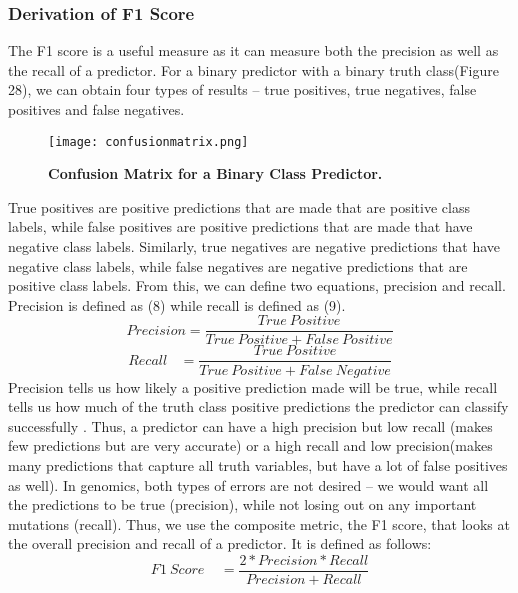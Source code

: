 \documentclass{article}
\begin{document}
\subsubsection{Derivation of F1 Score}
The F1 score is a useful measure as it can measure both the precision as well as the recall of a predictor. For a binary predictor with a binary truth class(Figure 28), we can obtain four types of results -- true positives, true negatives, false positives and false negatives. 
\begin{figure}[H]
\texttt{[image: confusionmatrix.png]}
\caption{\textbf{Confusion Matrix for a Binary Class Predictor.}}
\centering
\end{figure}
True positives are positive predictions that are made that are positive class labels, while false positives are positive predictions that are made that have negative class labels. Similarly, true negatives are negative predictions that have negative class labels, while false negatives are negative predictions that are positive class labels. From this, we can define two equations, precision and recall. Precision is defined as (8) while recall is defined as (9). 
\begin{equation}
Precision = \frac{True \ Positive}{True\  Positive + False \ Positive} 
\end{equation}
\begin{equation}
Recall\ \ \ \ = \frac{True\ Positive}{True \ Positive + False \ Negative} 
\end{equation}
Precision tells us how likely a positive prediction made will be true, while recall tells us how much of the truth class positive predictions the predictor can classify successfully . Thus, a predictor can have a high precision but low recall (makes few predictions but are very accurate) or a high recall and low precision(makes many predictions that capture all truth variables, but have a lot of false positives as well). In genomics, both types of errors are not desired -- we would want all the predictions to be true (precision), while not losing out on any important mutations (recall). Thus, we use the composite metric, the F1 score, that looks at the overall precision and recall of a predictor. It is defined as follows:
\begin{equation}
{F1} \ Score \ \ \  \ \ = \frac{2*Precision*Recall}{Precision + Recall} 
\end{equation}
\\
\end{document}
